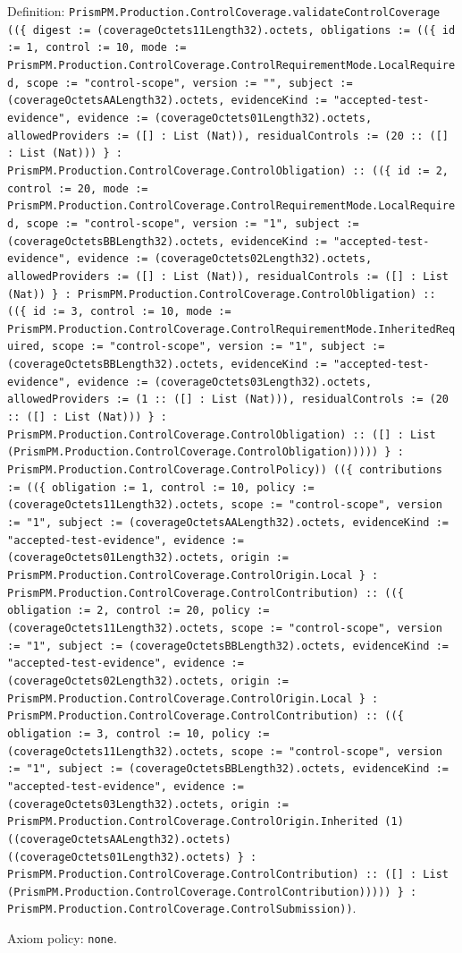 \documentclass[11pt]{article}
\begin{document}
\noindent Definition: \texttt{PrismPM.Production.ControlCoverage.validateControlCoverage ((\{ digest := (coverageOctets11Length32).octets, obligations := ((\{ id := 1, control := 10, mode := PrismPM.Production.ControlCoverage.ControlRequirementMode.LocalRequired, scope := "control-scope", version := "", subject := (coverageOctetsAALength32).octets, evidenceKind := "accepted-test-evidence", evidence := (coverageOctets01Length32).octets, allowedProviders := ([] : List (Nat)), residualControls := (20 :: ([] : List (Nat))) \} : PrismPM.Production.ControlCoverage.ControlObligation) :: ((\{ id := 2, control := 20, mode := PrismPM.Production.ControlCoverage.ControlRequirementMode.LocalRequired, scope := "control-scope", version := "1", subject := (coverageOctetsBBLength32).octets, evidenceKind := "accepted-test-evidence", evidence := (coverageOctets02Length32).octets, allowedProviders := ([] : List (Nat)), residualControls := ([] : List (Nat)) \} : PrismPM.Production.ControlCoverage.ControlObligation) :: ((\{ id := 3, control := 10, mode := PrismPM.Production.ControlCoverage.ControlRequirementMode.InheritedRequired, scope := "control-scope", version := "1", subject := (coverageOctetsBBLength32).octets, evidenceKind := "accepted-test-evidence", evidence := (coverageOctets03Length32).octets, allowedProviders := (1 :: ([] : List (Nat))), residualControls := (20 :: ([] : List (Nat))) \} : PrismPM.Production.ControlCoverage.ControlObligation) :: ([] : List (PrismPM.Production.ControlCoverage.ControlObligation))))) \} : PrismPM.Production.ControlCoverage.ControlPolicy)) ((\{ contributions := ((\{ obligation := 1, control := 10, policy := (coverageOctets11Length32).octets, scope := "control-scope", version := "1", subject := (coverageOctetsAALength32).octets, evidenceKind := "accepted-test-evidence", evidence := (coverageOctets01Length32).octets, origin := PrismPM.Production.ControlCoverage.ControlOrigin.Local \} : PrismPM.Production.ControlCoverage.ControlContribution) :: ((\{ obligation := 2, control := 20, policy := (coverageOctets11Length32).octets, scope := "control-scope", version := "1", subject := (coverageOctetsBBLength32).octets, evidenceKind := "accepted-test-evidence", evidence := (coverageOctets02Length32).octets, origin := PrismPM.Production.ControlCoverage.ControlOrigin.Local \} : PrismPM.Production.ControlCoverage.ControlContribution) :: ((\{ obligation := 3, control := 10, policy := (coverageOctets11Length32).octets, scope := "control-scope", version := "1", subject := (coverageOctetsBBLength32).octets, evidenceKind := "accepted-test-evidence", evidence := (coverageOctets03Length32).octets, origin := PrismPM.Production.ControlCoverage.ControlOrigin.Inherited (1) ((coverageOctetsAALength32).octets) ((coverageOctets01Length32).octets) \} : PrismPM.Production.ControlCoverage.ControlContribution) :: ([] : List (PrismPM.Production.ControlCoverage.ControlContribution))))) \} : PrismPM.Production.ControlCoverage.ControlSubmission))}.\par
\noindent Axiom policy: \texttt{none}.\par
\end{document}
